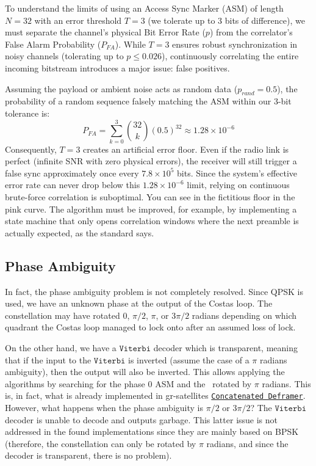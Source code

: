 To understand the limits of using an Access Sync Marker (ASM) of length $N=32$ with an error threshold $T=3$ (we tolerate up to 3 bits of difference), we must separate the channel's physical Bit Error Rate ($p$) from the correlator's False Alarm Probability ($P_{FA}$). While $T=3$ ensures robust synchronization in noisy channels (tolerating up to $p \le 0.026$), continuously correlating the entire incoming bitstream introduces a major issue: false positives.

Assuming the payload or ambient noise acts as random data ($p_{rand} = 0.5$), the probability of a random sequence falsely matching the ASM within our 3-bit tolerance is:
\begin{equation}
    P_{FA} = \sum_{k=0}^{3} \binom{32}{k} (0.5)^{32} \approx 1.28 \times 10^{-6}
\end{equation}
Consequently, $T=3$ creates an artificial error floor. Even if the radio link is perfect (infinite SNR with zero physical errors), the receiver will still trigger a false sync approximately once every $7.8 \times 10^5$ bits. Since the system's effective error rate can never drop below this $1.28 \times 10^{-6}$ limit, relying on continuous brute-force correlation is suboptimal. You can see in  the fictitious floor in the pink curve. The algorithm must be improved, for example, by implementing a state machine that only opens correlation windows where the next preamble is actually expected, as the standard says.

\subsection{Phase Ambiguity}

In fact, the phase ambiguity problem is not completely resolved. Since QPSK is used, we have an unknown phase at the output of the Costas loop. The constellation may have rotated $0$, $\pi/2$, $\pi$, or $3\pi/2$ radians depending on which quadrant the Costas loop managed to lock onto after an assumed loss of lock. 

On the other hand, we have a $\mathtt{Viterbi}$ decoder which is transparent, meaning that if the input to the $\mathtt{Viterbi}$ is inverted (assume the case of a $\pi$ radians ambiguity), then the output will also be inverted. This allows applying the algorithms by searching for the phase $0$ ASM and the \invASM~rotated by $\pi$ radians. This is, in fact, what is already implemented in gr-satellites \href{https://github.com/daniestevez/gr-satellites/blob/main/python/components/deframers/ccsds_concatenated_deframer.py}{\texttt{Concatenated Deframer}}. However, what happens when the phase ambiguity is $\pi/2$ or $3\pi/2$? The $\mathtt{Viterbi}$ decoder is unable to decode and outputs garbage. This latter issue is not addressed in the found implementations since they are mainly based on BPSK (therefore, the constellation can only be rotated by $\pi$ radians, and since the decoder is transparent, there is no problem). 

